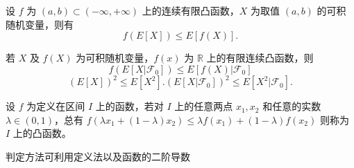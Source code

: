 \documentclass[lang=cn,10pt,thmcnt=section]{elegantbook}
\begin{document}
\begin{theorem}
	设 $f$ 为 $(a, b) \subset (-\infty, +\infty)$ 上的连续有限凸函数，$X$ 为取值 $(a, b)$ 的可积随机变量，则有
\[
f(E[X]) \leq E[f(X)]. 
\]
\end{theorem}
\begin{theorem}
	若 $X$ 及 $f(X)$ 为可积随机变量，$f(x)$ 为 $\mathbb{R}$ 上的有限连续凸函数，则
	\[
	f(E[X|\mathscr{F}_0]) \leq E[f(X)|\mathscr{F}_0] 
	\]
	\[
	(E[X])^2 \leq E[X^2]. (E[X|\mathscr{F}_0])^2 \leq E[X^2|\mathscr{F}_0].
	\]
\end{theorem}
\begin{definition}
	设 $f$ 为定义在区间 $I$ 上的函数，若对 $I$ 上的任意两点 $x_1, x_2$ 和任意的实数 $\lambda \in (0, 1)$，总有 $f(\lambda x_1 + (1-\lambda)x_2) \leq \lambda f(x_1) + (1-\lambda)f(x_2)$ 则称为 $I$ 上的凸函数。


\end{definition}
判定方法可利用定义法以及函数的二阶导数 
\end{document}
